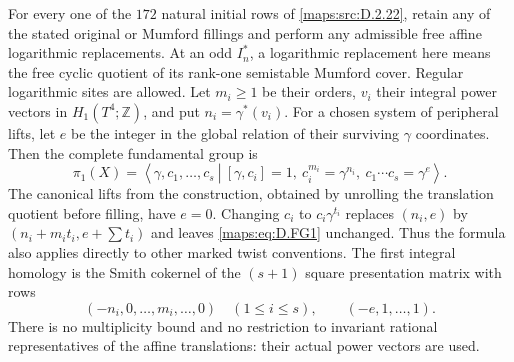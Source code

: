 \begin{theorem}\label{maps:src:D.2.23}


For every one of the $172$ natural initial rows of \ref{maps:src:D.2.22}, retain any
of the stated original or Mumford fillings and perform any admissible
free affine logarithmic replacements. At an odd $I_n^*$, a logarithmic
replacement here means the free cyclic quotient of its rank-one
semistable Mumford cover. Regular logarithmic sites are allowed.
Let $m_i\ge1$ be their orders, $v_i$ their integral power vectors in
$H_1(T^4;\mathbb Z)$, and put $n_i=\gamma^*(v_i)$.
For a chosen system of peripheral lifts, let $e$ be the integer in
the global relation of their surviving $\gamma$ coordinates.
Then the complete fundamental group is
\[
 \pi_1(X)=\left\langle \gamma,c_1,\ldots,c_s\ \left|\
 [\gamma,c_i]=1,\ c_i^{m_i}=\gamma^{n_i},\
 c_1\cdots c_s=\gamma^e\right.\right\rangle .                 \tag{D.FG1}\label{maps:eq:D.FG1}
\]
The canonical lifts from the construction, obtained by unrolling the
translation quotient before filling, have $e=0$. Changing $c_i$ to
$c_i\gamma^{t_i}$ replaces $(n_i,e)$ by
$(n_i+m_it_i,e+\sum t_i)$ and leaves \eqref{maps:eq:D.FG1} unchanged.
Thus the formula also applies directly to other marked twist conventions.
The first integral homology is the Smith cokernel of the $(s+1)$ square
presentation matrix with rows
\[
 (-n_i,0,\ldots,m_i,\ldots,0)\quad(1\le i\le s),
 \qquad (-e,1,\ldots,1).                                    \tag{D.FG2}\label{maps:eq:D.FG2}
\]
There is no multiplicity bound and no restriction to invariant rational
representatives of the affine translations: their actual power vectors
are used.


\end{theorem}

